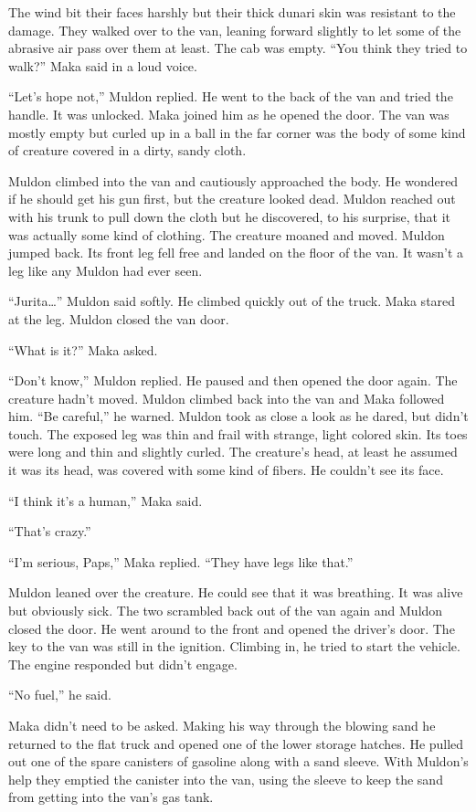The wind bit their faces harshly but their thick dunari skin was resistant to the damage. They
walked over to the van, leaning forward slightly to let some of the abrasive air pass over them
at least. The cab was empty. ``You think they tried to walk?'' Maka said in a loud voice.

``Let's hope not,'' Muldon replied. He went to the back of the van and tried the handle. It was
unlocked. Maka joined him as he opened the door. The van was mostly empty but curled up in a
ball in the far corner was the body of some kind of creature covered in a dirty, sandy cloth.

Muldon climbed into the van and cautiously approached the body. He wondered if he should get his
gun first, but the creature looked dead. Muldon reached out with his trunk to pull down the
cloth but he discovered, to his surprise, that it was actually some kind of clothing. The
creature moaned and moved. Muldon jumped back. Its front leg fell free and landed on the floor
of the van. It wasn't a leg like any Muldon had ever seen.

``Jurita\ldots'' Muldon said softly. He climbed quickly out of the truck. Maka stared at the
leg. Muldon closed the van door.

``What is it?'' Maka asked.

``Don't know,'' Muldon replied. He paused and then opened the door again. The creature hadn't
moved. Muldon climbed back into the van and Maka followed him. ``Be careful,'' he warned. Muldon
took as close a look as he dared, but didn't touch. The exposed leg was thin and frail with
strange, light colored skin. Its toes were long and thin and slightly curled. The creature's
head, at least he assumed it was its head, was covered with some kind of fibers. He couldn't see
its face.

``I think it's a human,'' Maka said.

``That's crazy.''

``I'm serious, Paps,'' Maka replied. ``They have legs like that.''

Muldon leaned over the creature. He could see that it was breathing. It was alive but obviously
sick. The two scrambled back out of the van again and Muldon closed the door. He went around to
the front and opened the driver's door. The key to the van was still in the ignition.  Climbing
in, he tried to start the vehicle. The engine responded but didn't engage.

``No fuel,'' he said.

Maka didn't need to be asked. Making his way through the blowing sand he returned to the flat
truck and opened one of the lower storage hatches. He pulled out one of the spare canisters of
gasoline along with a sand sleeve. With Muldon's help they emptied the canister into the van,
using the sleeve to keep the sand from getting into the van's gas tank.

